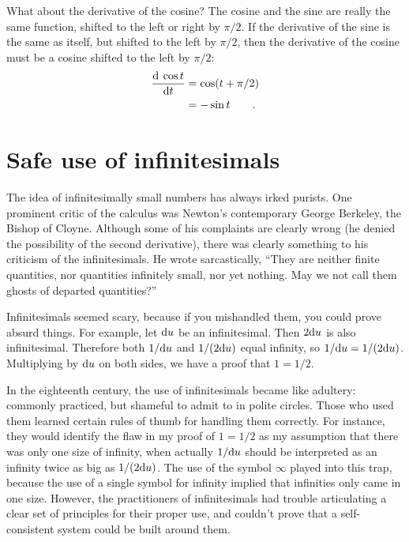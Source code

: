\begin{eg}\label{eg:dcos}
What about the derivative of the cosine? The cosine and the sine are really the same function, shifted to the left or right by
$\pi/2$. If the derivative of the sine is the same as itself, but shifted to the left by $\pi/2$, then the derivative of
the cosine must be a cosine shifted to the left by $\pi/2$:
\begin{align*}
  \frac{\textup{d}\: \cos t}{\textup{d} t} &= \cos(t+\pi/2) \\
                               &= -\sin t \qquad .
\end{align*}
\end{eg}

\section{Safe use of infinitesimals}

The idea of infinitesimally small numbers has always irked purists. One prominent critic of the calculus was Newton's
contemporary George Berkeley, the Bishop of Cloyne. Although some of his complaints are clearly wrong (he denied the
possibility of the second derivative), there was clearly something to his criticism of the infinitesimals. He wrote
sarcastically,
``They are neither finite quantities, nor quantities infinitely small, nor yet nothing. May we not call them ghosts of departed quantities?''

%
%
Infinitesimals seemed scary, because if you mishandled them, you could prove absurd things. For example, let $\textup{d} u$ be
an infinitesimal. Then $2\textup{d} u$ is also infinitesimal. Therefore both $1/\textup{d} u$ and $1/(2\textup{d} u)$ equal infinity, so
$1/\textup{d} u = 1/(2\textup{d} u)$. Multiplying by $\textup{d} u$ on both sides, we have a proof that $1=1/2$.\label{bogus-proof}

In the eighteenth century, the use of infinitesimals became like adultery: commonly practiced, but shameful to admit
to in polite circles. Those who used them learned certain rules of thumb for handling them correctly. For instance,
they would identify the flaw in my proof of $1=1/2$ as my assumption that there was only one size of infinity,
when actually $1/\textup{d} u$ should be interpreted as an infinity twice as big as $1/(2\textup{d} u)$. The use of the symbol
$\infty$ played into this trap, because the use of a single symbol for infinity implied that infinities only came
in one size. However, the practitioners of infinitesimals had trouble articulating a clear set of principles
for their proper use, and couldn't prove that a self-consistent system could be built around them.

